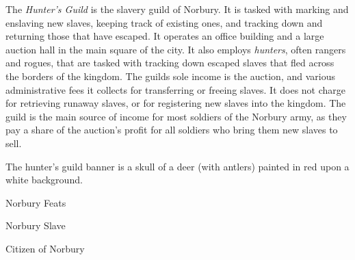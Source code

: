 The \emph{Hunter's Guild} is the slavery guild of Norbury. It is tasked with
marking and enslaving new slaves, keeping track of existing ones, and tracking
down and returning those that have escaped. It operates an office building and
a large auction hall in the main square of the city. It also employs
\emph{hunters}, often rangers and rogues, that are tasked with tracking down
escaped slaves that fled across the borders of the kingdom. The guilds sole
income is the auction, and various administrative fees it collects for
transferring or freeing slaves. It does not charge for retrieving runaway
slaves, or for registering new slaves into the kingdom. The guild is the main
source of income for most soldiers of the Norbury army, as they pay a share of
the auction's profit for all soldiers who bring them new slaves to sell.

The hunter's guild banner is a skull of a deer (with antlers) painted in red
upon a white background.

\begin{35efeats}{Norbury Feats}
  \begin{35efeat}{Norbury Slave}
  \end{35efeat}
  \begin{35efeat}{Citizen of Norbury}
  \end{35efeat}
\end{35efeats}
